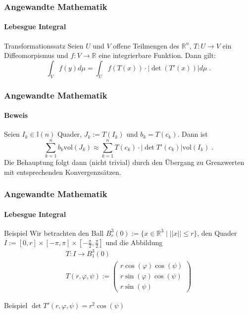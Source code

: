 \documentclass{beamer}
\begin{document}
\begin{frame}
    \frametitle{Angewandte Mathematik}
\framesubtitle{Lebesgue Integral}
\begin{block}{Transformationssatz}
Seien $U$ und $V$ offene Teilmengen des $\mathbb{R}^n$, $T: U \to V$ ein Diffeomorpismus und $f: V \to \mathbb{R}$ eine integrierbare Funktion. Dann gilt:
$$ \int_V  f(y)  d \mu = \int_U f(T (x))  \cdot | \det(T' (x)) | d \mu   \; .$$
\end{block}
 \end{frame}

\begin{frame}
    \frametitle{Angewandte Mathematik}
\framesubtitle{Beweis}
Seien $I_k \in \mathbb{I}(n)$ Quader, $J_k := T(I_k)$ und $b_k = T(c_k)$. Dann ist 
$$\sum_{k=1}^n  b_k  \text{vol}(J_k) \approx  \sum_{k=1}^n T(c_k) \cdot | \det T' (c_k)|  \text{vol}(I_k) \; .$$
Die Behauptung folgt dann (nicht trivial) durch den Übergang zu Grenzwerten mit entsprechenden Konvergenzsätzen.
 \end{frame}


\begin{frame}
    \frametitle{Angewandte Mathematik}
\framesubtitle{Lebesgue Integral}
\begin{block}{Beispiel}
Wir betrachten den Ball $B_r^3(0):= \{ x \in \mathbb{R}^3 \; | \; || x || \leq r  \}$, den Quader $I := [0,r] \times [- \pi, \pi] \times [- \frac{\pi}{2}, \frac{\pi}{2}]$ und die Abbildung
\begin{align*}
T : I \to B_1^3(0) \\
T(r, \varphi, \psi) := \begin{pmatrix} r \cos(\varphi) \cos(\psi)   \\  r \sin(\varphi) \cos(\psi) \\ r  \sin(\psi)     \end{pmatrix}
\end{align*}
\end{block}
\begin{block}{Beispiel}
$\det T'(r, \varphi, \psi) = r^2 \cos(\psi)$
\end{block}
 \end{frame}
\end{document}
